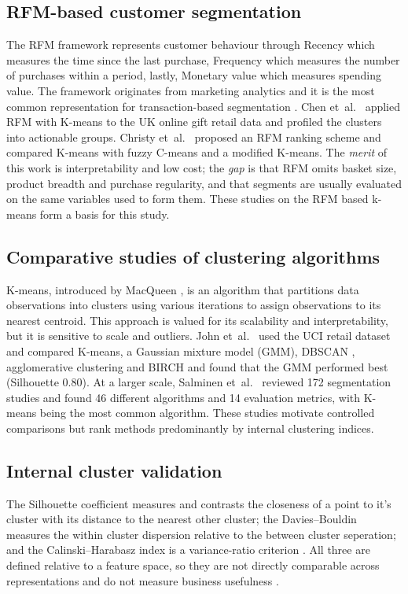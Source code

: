 \documentclass[conference,10pt]{IEEEtran}
\begin{document}
\subsection{RFM-based customer segmentation}
The RFM framework represents customer behaviour through Recency which measures the time since the last purchase, Frequency which measures the number of purchases within a period, lastly, Monetary value which measures spending value. The framework originates from marketing analytics and
it is the most common representation for transaction-based segmentation
\cite{gomes2023review}. Chen et~al.\
\cite{chen2012rfm} applied RFM with K-means to the 
UK online gift retail data and profiled the clusters into actionable
groups. Christy et~al.\ \cite{christy2021rfm} proposed an RFM ranking scheme
and compared K-means with fuzzy C-means and a modified K-means. The
\emph{merit} of this work is interpretability and low cost; the \emph{gap}
is that RFM omits basket size, product breadth and purchase regularity, and
that segments are usually evaluated on the same variables used to form
them. These studies on the RFM based k-means form a basis for this study.

\subsection{Comparative studies of clustering algorithms}
K-means, introduced by MacQueen \cite{macqueen1967some}, is an algorithm that partitions data observations into clusters using various iterations to assign observations to its nearest centroid. This approach is valued for its
scalability and interpretability, but it is
sensitive to scale and outliers.  John et~al.\
\cite{john2023exploration} used the UCI  retail dataset and compared K-means, a Gaussian mixture model (GMM),
DBSCAN \cite{ester1996dbscan}, agglomerative clustering and BIRCH and found
that the GMM performed best (Silhouette 0.80). At a larger scale, Salminen
et~al.\ \cite{salminen2023algorithms} reviewed 172 segmentation studies and
found 46 different algorithms and 14 evaluation metrics, with K-means being the most common algorithm. These
studies motivate controlled comparisons but rank methods
predominantly by internal clustering indices.

\subsection{Internal cluster validation}
The Silhouette coefficient \cite{rousseeuw1987silhouettes} measures and contrasts the closeness of a point to it's cluster with its distance to the nearest other
cluster; the Davies--Bouldin measures the within cluster dispersion relative to the between cluster seperation; and the Calinski--Harabasz index is a
variance-ratio criterion \cite{ikotun2025cluster}. All three are defined relative to a feature space, so they are not
directly comparable across representations and do not measure business
usefulness \cite{salminen2023algorithms}.
\end{document}
